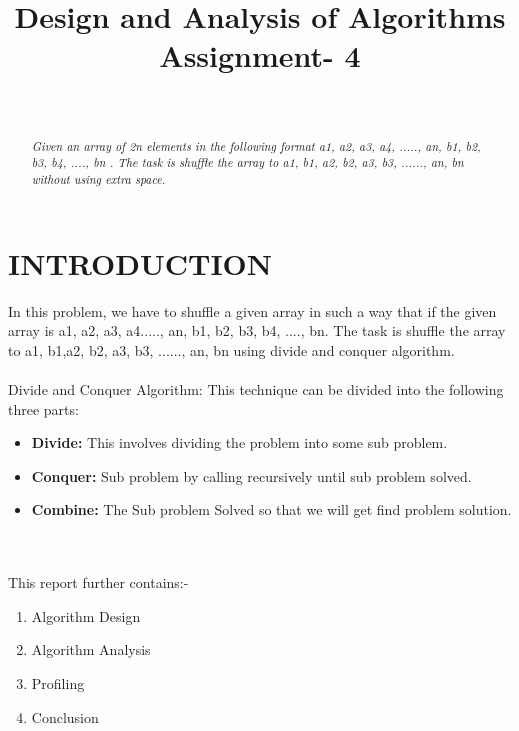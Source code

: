 \documentclass[conference]{IEEEtran}
\begin{document}
\title{\LARGE Design and Analysis of Algorithms Assignment- 4
}


 \author{
 }
 
 \author{ 
\\
}


\maketitle

\begin{abstract}
\textit{ Given an array of 2n elements in the following format { a1, a2, a3, a4,
....., an, b1, b2, b3, b4, ...., bn }. The task is shuffle the array to {a1, b1,
a2, b2, a3, b3, ......, an, bn } without using extra space.}
\end{abstract}

\IEEEoverridecommandlockouts


\IEEEpeerreviewmaketitle


\section{\textbf{ INTRODUCTION}}
In this problem, we have to shuffle a given array in such a way that if the given array is a1, a2, a3, a4....., an, b1, b2, b3, b4, ...., bn. The task is shuffle the array to {a1, b1,a2, b2, a3, b3, ......, an, bn }using divide and conquer algorithm.\\\\
Divide and Conquer Algorithm:
This technique can be divided into the following three parts:
\begin{itemize}
  \item \textbf{Divide:} This involves dividing the problem into some sub problem.
  \item \textbf{Conquer:} Sub problem by calling recursively until sub problem solved.
  \item \textbf{Combine:} The Sub problem Solved so that we will get find problem solution.
\end{itemize}\\\\
This report further contains:-
\begin{enumerate}
  \item Algorithm Design
  \item Algorithm Analysis
  \item Profiling
  \item Conclusion
\end{enumerate}
\end{document}
